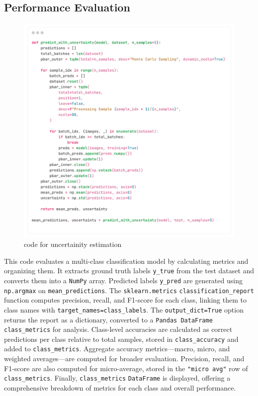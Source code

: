 \documentclass[12pt,onecolumn]{report}
\begin{document}
\subsection{Performance Evaluation}
\begin{figure}[H]
    \centering
    \includegraphics[width=0.8\columnwidth]{figures/imp_uncertainity_estimation.png}  %
    \caption{code for uncertainity estimation} %
    \label{fig:imp_uncertainity_estimation} %
\end{figure}
This code evaluates a multi-class classification model by calculating metrics and organizing them. It extracts ground truth labels \texttt{y\_true} from the test dataset and converts them into a \texttt{NumPy} array. Predicted labels \texttt{y\_pred} are generated using \texttt{np.argmax} on \texttt{mean\_predictions}. The \texttt{sklearn.metrics} \texttt{classification\_report} function computes precision, recall, and F1-score for each class, linking them to class names with \texttt{target\_names=class\_labels}. The \texttt{output\_dict=True} option returns the report as a dictionary, converted to a \texttt{Pandas DataFrame} \texttt{class\_metrics} for analysis. Class-level accuracies are calculated as correct predictions per class relative to total samples, stored in \texttt{class\_accuracy} and added to \texttt{class\_metrics}. Aggregate accuracy metrics—macro, micro, and weighted averages—are computed for broader evaluation. Precision, recall, and F1-score are also computed for micro-average, stored in the \texttt{"micro avg"} row of \texttt{class\_metrics}. Finally, \texttt{class\_metrics} \texttt{DataFrame} is displayed, offering a comprehensive breakdown of metrics for each class and overall performance.
\end{document}
